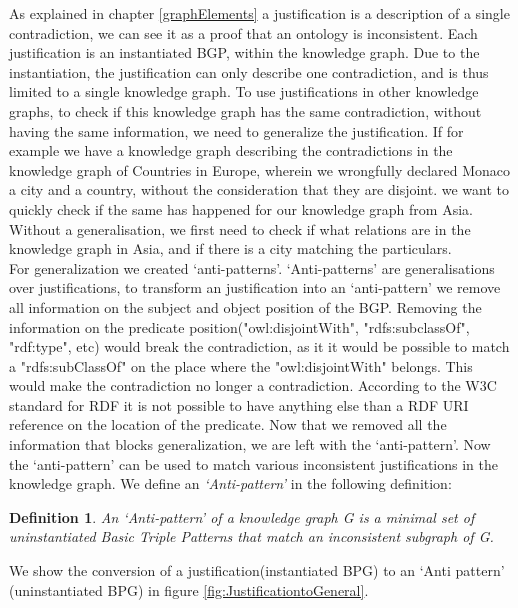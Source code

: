 \documentclass[11pt,letterpaper ,oneside ]{book}
\newtheorem{definition}{Definition}
\begin{document}
As explained in chapter \ref{graphElements} a justification is a description of a single contradiction, we can see it as a proof that an ontology is inconsistent. Each justification is an instantiated BGP, within the knowledge graph. Due to the instantiation, the justification can only describe one contradiction, and is thus limited to a single knowledge graph. To use justifications in other knowledge graphs, to check if this knowledge graph has the same contradiction, without having the same information, we need to generalize the justification. If for example we have a knowledge graph describing the contradictions in the knowledge graph of Countries in Europe, wherein we wrongfully declared Monaco a city and a country, without the consideration that they are disjoint. we want to quickly check if the same has happened for our knowledge graph from Asia. Without a generalisation, we first need to check if what relations are in the knowledge graph in Asia, and if there is a city matching the particulars.\\

For generalization we created `anti-patterns'. `Anti-patterns' are generalisations over justifications, to transform an justification into an `anti-pattern' we remove all information on the subject and object position of the BGP. Removing the information on the predicate position("owl:disjointWith", "rdfs:subclassOf", "rdf:type", etc) would break the contradiction, as it it would be possible to match a "rdfs:subClassOf" on the place where the "owl:disjointWith" belongs. This would make the contradiction no longer a contradiction. According to the W3C standard for RDF \cite{rdfPrimer:2014} it is not possible to have anything else than a RDF URI reference on the location of the predicate.
Now that we removed all the information that blocks generalization, we are left with the `anti-pattern'. Now the `anti-pattern' can be used to match various inconsistent justifications in the knowledge graph. We define an \textit{`Anti-pattern'} in the following definition:\\

\begin{definition} 
	An \textit{`Anti-pattern'} of a knowledge graph G is a minimal set of uninstantiated Basic Triple Patterns that match an inconsistent subgraph of G.
\end{definition}

We show the conversion of a justification(instantiated BPG) to an `Anti pattern' (uninstantiated BPG) in figure \ref{fig:JustificationtoGeneral}.
\end{document}
